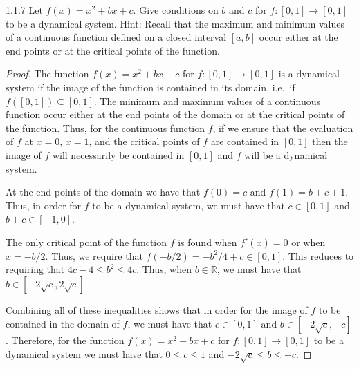 \begin{problem}{1.1.7}
  Let $f(x) = x^2 + bx + c$. Give conditions on $b$ and $c$ for $f: [0, 1] \to [0, 1]$
  to be a dynamical system. Hint: Recall that the maximum and minimum values of
  a continuous function defined on a closed interval $[a, b]$ occur either at
  the end points or at the critical points of the function.
\end{problem}

\begin{proof}
  The function $f(x) = x^2 + bx + c$ for $f: [0, 1] \to [0, 1]$ is a dynamical
  system if the image of the function is contained in its domain, i.e.\ if
  $f([0,1]) \subseteq [0,1]$. The minimum and maximum values of a continuous function
  occur either at the end points of the domain or at the critical points of the function.
  Thus, for the continuous function $f$, if we ensure that the evaluation of $f$ at
  $x=0$, $x=1$, and the critical points of $f$ are contained in $[0, 1]$ then the
  image of $f$ will necessarily be contained in $[0, 1]$ and $f$ will be a
  dynamical system.

  At the end points of the domain we have that $f(0) = c$ and $f(1) = b + c + 1$. Thus, in order for $f$ to be
  a dynamical system, we must have that $c \in [0, 1]$ and $b + c \in [-1, 0]$.

  The only critical point of the function $f$ is found when $f'(x) = 0$ or when $x = -b/2$.
  Thus, we require that $f(-b/2) = -b^2/4 + c \in [0, 1]$. This reduces to
  requiring that $4c - 4 \leq b^2 \leq 4c$.
  Thus, when $b\in\mathbb{R}$, we must have that $b \in [-2\sqrt{c}, 2\sqrt{c}]$.

  Combining all of these inequalities shows that in order for the image of $f$
  to be contained in the domain of $f$, we must have that $c \in [0, 1]$ and $b \in [-2\sqrt{c}, -c]$.
  Therefore, for the function $f(x) = x^2 + bx + c$ for $f: [0, 1] \to [0, 1]$ to be a dynamical system we must have that $0 \leq c \leq 1$
  and $-2\sqrt{c} \leq b \leq -c$.

\end{proof}
\newpage

